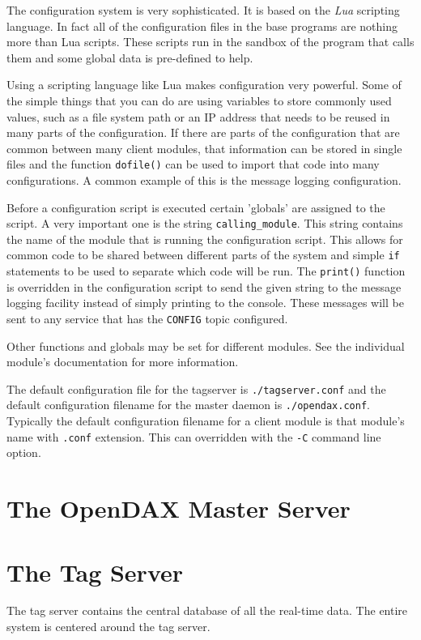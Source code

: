 The \opendax configuration system is very sophisticated.  It is based on the \textit{Lua} scripting language.  In fact all of the configuration files in the base \opendax programs are nothing more than Lua scripts.  These scripts run in the sandbox of the program that calls them and some global data is pre-defined to help.

Using a scripting language like Lua makes configuration very powerful.  Some of the simple things that you can do are using variables to store commonly used values, such as a file system path or an IP address that needs to be reused in many parts of the configuration.  If there are parts of the configuration that are common between many client modules, that information can be stored in single files and the function \texttt{dofile()} can be used to import that code into many configurations.  A common example of this is the message logging configuration.

Before a configuration script is executed certain 'globals' are assigned to the script.  A very important one is the string \texttt{calling\_module}.  This string contains the name of the module that is running the configuration script.  This allows for common code to be shared between different parts of the system and simple \texttt{if} statements to be used to separate which code will be run.  The \texttt{print()} function is overridden in the configuration script to send the given string to the message logging facility instead of simply printing to the console.  These messages will be sent to any service that has the \texttt{CONFIG} topic configured.

Other functions and globals may be set for different modules.  See the individual module's documentation for more information.

The default configuration file for the tagserver is \texttt{./tagserver.conf} and the default configuration filename for the master daemon is \texttt{./opendax.conf}.  Typically the default configuration filename for a client module is that module's name with \texttt{.conf} extension.  This can overridden with the \texttt{-C} command line option.

\chapter{The OpenDAX Master Server}


\chapter{The Tag Server}
The tag server contains the central database of all the real-time data.  The entire system is centered around the tag server.

